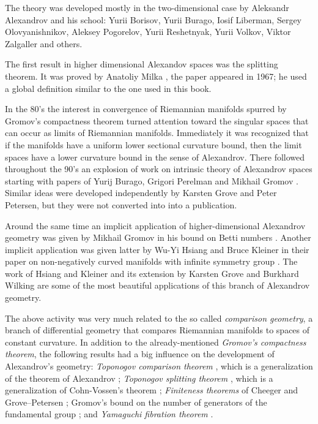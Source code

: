 The theory was developed mostly in the two-dimensional case 
by Aleksandr Alexandrov
and his school:  
Yurii  Borisov,
Yurii  Burago,
Iosif  Liberman,
Sergey  Olovyanishnikov,
Aleksey  Pogorelov,
Yurii  Reshetnyak,
Yurii  Volkov,
Viktor  Zalgaller and others.

The first result in higher dimensional Alexandov spaces was the splitting theorem.
It was proved by Anatoliy Milka \cite{milka-line}, the paper appeared in 1967;
he used a global definition similar to the one used in this book. %

In the 80's the interest in convergence of Riemannian manifolds spurred by Gromov's compactness theorem \cite{gromov-MS} turned attention toward the singular spaces that can occur as limits of Riemannian manifolds.
Immediately it was recognized that if the manifolds have a uniform lower sectional curvature bound, then the limit spaces have a lower curvature bound in the sense of Alexandrov. 
There followed throughout the 90's an explosion of work on intrinsic theory of Alexandrov spaces starting with papers of Yurij Burago, Grigori Perelman and Mikhail Gromov  \cite{burago-gromov-perelman,perelman:spaces2}.
Similar ideas were developed independently by Karsten Grove and Peter Petersen, but they were not converted into into a publication.

Around the same time an implicit application of higher-dimensional Alexandrov geometry was given by Mikhail Gromov in his bound on Betti numbers \cite{gromov:betti}.
Another implicit application was given latter by Wu-Yi Hsiang and Bruce Kleiner in their paper on non-negatively curved manifolds with infinite symmetry group \cite{hsiang-kleiner}.
The work of Hsiang and Kleiner and its extension by Karsten Grove and Burkhard Wilking \cite{grove-wilking} are some of the most beautiful applications of this branch of Alexandrov geometry.

The above activity was very much related to the so called {}\emph{comparison geometry},
a branch of differential geometry that compares Riemannian manifolds  to  spaces of constant curvature.
In addition to the already-mentioned {}\emph{Gromov's compactness theorem},
the following results had a big influence on the development of Alexandrov's geometry:
{}\emph{Toponogov comparison theorem} \cite{toponogov-globalization+splitting}, which is a generalization of the theorem of Alexandrov \cite{alexandrov-comparison};
{}\emph{Toponogov splitting theorem} \cite{toponogov-globalization+splitting}, which is a generalization of Cohn-Vossen's theorem \cite{cohn-vossen_line};
{}\emph{Finiteness theorems} of
Cheeger
and
Grove--Petersen \cite{cheeger-finiteness,grove-petersen:finiteness};
Gromov's bound on the number of generators of the fundamental group 
\cite[1.5]{gromov:almost-flat};
and 
{}\emph{Yamaguchi fibration theorem} \cite{yamaguchi-fibration}.

